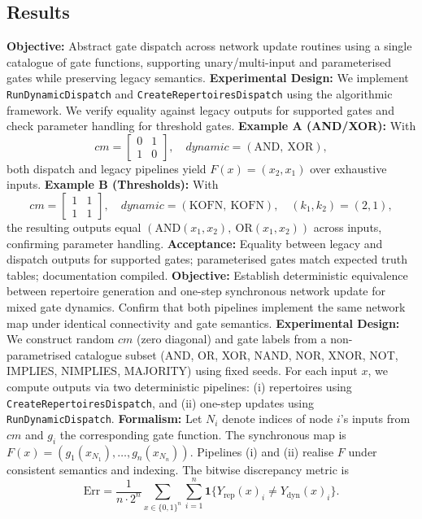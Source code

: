 \subsection{Results}
\textbf{Objective:} Abstract gate dispatch across network update routines using a single catalogue of gate functions, supporting unary/multi-input and parameterised gates while preserving legacy semantics.
\textbf{Experimental Design:} We implement \texttt{RunDynamicDispatch} and \texttt{CreateRepertoiresDispatch} using the algorithmic framework. We verify equality against legacy outputs for supported gates and check parameter handling for threshold gates.
\textbf{Example A (AND/XOR):} With
\[
cm = \begin{bmatrix}0 & 1\\ 1 & 0\end{bmatrix},\quad dynamic=(\text{AND},\ \text{XOR}),
\]
both dispatch and legacy pipelines yield \(F(x)=(x_2,x_1)\) over exhaustive inputs.
\textbf{Example B (Thresholds):} With
\[
cm = \begin{bmatrix}1 & 1\\ 1 & 1\end{bmatrix},\quad dynamic=(\text{KOFN},\ \text{KOFN}),\quad (k_1, k_2)=(2,1),
\]
the resulting outputs equal \((\text{AND}(x_1,x_2),\ \text{OR}(x_1,x_2))\) across inputs, confirming parameter handling.
\textbf{Acceptance:} Equality between legacy and dispatch outputs for supported gates; parameterised gates match expected truth tables; documentation compiled.
\textbf{Objective:} Establish deterministic equivalence between repertoire generation and one-step synchronous network update for mixed gate dynamics. Confirm that both pipelines implement the same network map under identical connectivity and gate semantics.
\textbf{Experimental Design:} We construct random \(cm\) (zero diagonal) and gate labels from a non-parametrised catalogue subset (AND, OR, XOR, NAND, NOR, XNOR, NOT, IMPLIES, NIMPLIES, MAJORITY) using fixed seeds. For each input \(x\), we compute outputs via two deterministic pipelines: (i) repertoires using \texttt{CreateRepertoiresDispatch}, and (ii) one-step updates using \texttt{RunDynamicDispatch}.
\textbf{Formalism:} Let \(N_i\) denote indices of node \(i\)'s inputs from \(cm\) and \(g_i\) the corresponding gate function. The synchronous map is \(F(x) = (g_1(x_{N_1}),\dots,g_n(x_{N_n}))\). Pipelines (i) and (ii) realise \(F\) under consistent semantics and indexing. The bitwise discrepancy metric is
\begin{equation*}
\mathrm{Err} = \frac{1}{n\cdot 2^n} \sum_{x \in \{0,1\}^n} \sum_{i=1}^n \mathbf{1}\big\{Y_{\mathrm{rep}}(x)_i \neq Y_{\mathrm{dyn}}(x)_i\big\}.
\end{equation*}
